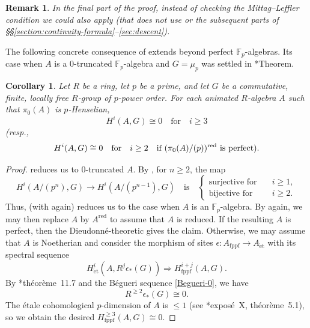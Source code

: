 \documentclass[11pt, reqno]{amsart}
\newcommand{\bF}{\mathbb{F}}
\newcommand{\eps}{\epsilon}
\newcommand{\et}{\mathrm{\acute{e}t}}	%
\newcommand{\fppf}{\mathrm{fppf}}		%
\newcommand{\ra}{\rightarrow}
\newcommand{\red}{{\mathrm{red}}}		%
\newcommand{\blem}{\begin{lemma}}
\newcommand{\elem}{\end{lemma}}
\newcommand{\x}{\text}
\providecommand{\qxq}[1]{\quad\text{#1}\quad}
\providecommand{\xq}[1]{\text{#1}\quad}
\newcommand{\tst}{\textstyle}
\newcommand{\bpf}{\begin{proof}}
\newcommand{\epf}{\end{proof}}
\newcommand{\bcor}{\begin{cor}}
\newcommand{\ecor}{\end{cor}}
\newcommand{\brem}{\begin{rem}}
\newcommand{\erem}{\end{rem}}
\numberwithin{equation}{numberingbase}
\theoremstyle{thms}
\newtheorem{cor}[numberingbase]{Corollary}
\newtheorem{lemma}[numberingbase]{Lemma}
\theoremstyle{claims}
\theoremstyle{defs}
\newtheorem{rem}[numberingbase]{Remark}
\theoremstyle{thms}
\theoremstyle{defs}
\theoremstyle{subsection-tweak}
\theoremstyle{subsection-tweak}
\begin{document}
\brem
In the final part of the proof, instead of checking the Mittag--Leffler condition we could also apply  (that does not use  or the subsequent parts of \S\S\ref{section:continuity-formula}--\ref{sec:descent}).
\erem




The following concrete consequence of  extends  beyond perfect $\bF_p$-algebras. Its case when $A$ is a $0$-truncated $\bF_p$-algebra and $G = \mu_{p}$ was settled in \cite{Tre80}*{Theorem}.

\bcor \label{no-higher-coho}
Let $R$ be a ring, let $p$ be a prime, and let $G$ be a commutative, finite, locally free $R$-group of $p$-power order. For each animated $R$-algebra $A$ such that $\pi_0(A)$ is $p$-Henselian, 
\[
\tst H^i(A, G) \cong 0 \qxq{for} i \ge 3 
\]
{\upshape(}resp., 
\[
H^i(A, G) \cong 0 \qxq{for} i \ge 2 \quad \x{if $(\pi_0(A)/(p))^\red$ is perfect{\upshape)}.}
\]
\ecor

\bpf
{} reduces us to $0$-truncated $A$. By , %
for $n \ge 2$, the map
\[
H^i(A/(p^n), G) \ra H^i(A/(p^{n - 1}), G) \qxq{is} \begin{cases}\xq{surjective for} &i \ge 1, \\  \xq{bijective for} &i \ge 2. \end{cases}
\]
Thus,	  (with  again) reduces us to the case when $A$ is an $\bF_p$-algebra. By  again,
 we may then replace $A$ by $A^\red$ to assume that $A$ is reduced. If the resulting $A$ is perfect, then the Dieudonn\'{e}-theoretic  gives the claim. Otherwise, we may assume that $A$ is Noetherian and consider the morphism of sites $\eps\colon A_\fppf \ra A_\et$ with its spectral sequence
\[
H^i_\et(A, R^j\eps_*(G)) \Rightarrow H^{i +j}_\fppf(A, G).
\]
By \cite{Gro68c}*{th\'{e}or\`{e}me~11.7} and the B\'{e}gueri sequence \eqref{Begueri-0}, we have 
\[
R^{\ge 2}\eps_*(G) \cong 0.
\] %
The \'{e}tale cohomological $p$-dimension of $A$ is $\le 1$ (see \cite{SGA4III}*{expos\'{e}~X, th\'{e}or\`{e}me~5.1}), so we obtain the desired $H^{\ge 3}_\fppf(A, G) \cong 0$. 
\epf




\end{document}
